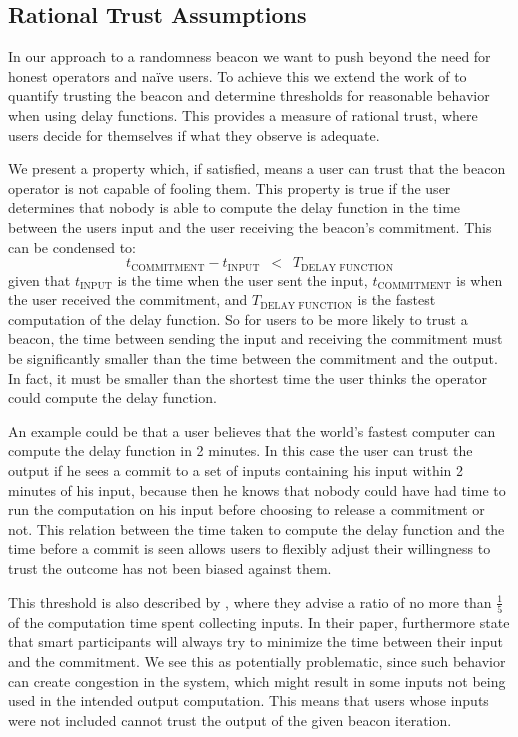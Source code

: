 \subsection{Rational Trust Assumptions}%
\label{sub:probabilistic_trust}
In our approach to a randomness beacon we want to push beyond the need for honest operators and naïve users.
To achieve this we extend the work of \citet{randomzoo} to quantify trusting the beacon and determine thresholds for reasonable behavior when using delay functions.
This provides a measure of rational trust, where users decide for themselves if what they observe is adequate.

We present a property which, if satisfied, means a user can trust that the beacon operator is not capable of fooling them.
This property is true if the user determines that nobody is able to compute the delay function in the time between the users input and the user receiving the beacon's commitment.
This can be condensed to:
\begin{equation*}
    t_\text{COMMITMENT} - t_\text{INPUT}\enspace <\enspace T_\text{DELAY FUNCTION}
\end{equation*}
given that $t_\text{INPUT}$ is the time when the user sent the input, $t_\text{COMMITMENT}$ is when the user received the commitment, and $T_\text{DELAY FUNCTION}$ is the fastest computation of the delay function.
So for users to be more likely to trust a beacon, the time between sending the input and receiving the commitment must be significantly smaller than the time between the commitment and the output.
In fact, it must be smaller than the shortest time the user thinks the operator could compute the delay function.

An example could be that a user believes that the world's fastest computer can compute the delay function in 2 minutes.
In this case the user can trust the output if he sees a commit to a set of inputs containing his input within 2 minutes of his input, because then he knows that nobody could have had time to run the computation on his input before choosing to release a commitment or not.
This relation between the time taken to compute the delay function and the time before a commit is seen allows users to flexibly adjust their willingness to trust the outcome has not been biased against them.

This threshold is also described by \citet{randomzoo}, where they advise a ratio of no more than $\frac{1}{5}$ of the computation time spent collecting inputs.
In their paper, \citeauthor{randomzoo} furthermore state that smart participants will always try to minimize the time between their input and the commitment.
We see this as potentially problematic, since such behavior can create congestion in the system, which might result in some inputs not being used in the intended output computation.
This means that users whose inputs were not included cannot trust the output of the given beacon iteration.

